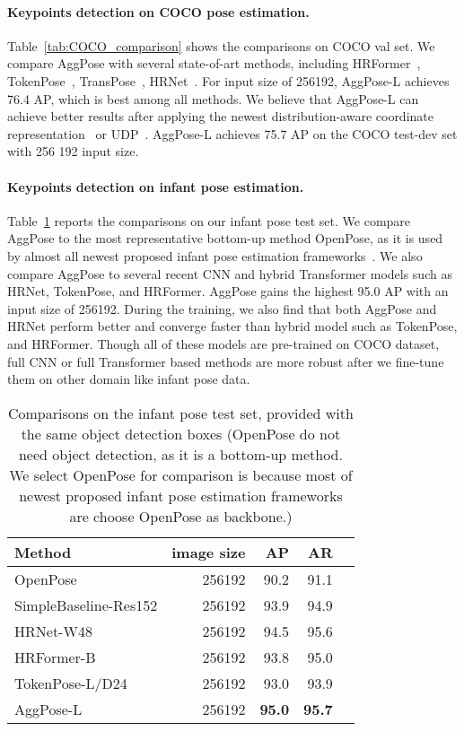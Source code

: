 \documentclass{article}
\begin{document}
\paragraph{Keypoints detection on COCO pose estimation.} Table~\ref{tab:COCO_comparison} shows the comparisons on COCO val set. We compare AggPose with several state-of-art methods, including HRFormer~\cite{yuan2021hrformer}, TokenPose~\cite{li2021tokenpose}, TransPose~\cite{yang2021transpose}, HRNet~\cite{wang2020deep}. For input size of 256192, AggPose-L achieves 76.4 AP, which is best among all methods. We believe that AggPose-L can achieve better results after applying the newest distribution-aware coordinate representation~\cite{zhang2020distribution} or UDP~\cite{huang2020devil}. AggPose-L achieves 75.7 AP on the COCO test-dev set with 256  192 input size. 

\paragraph{Keypoints detection on infant pose estimation.} Table~\ref{tab:infant_comparison} reports the comparisons on our infant pose test set. We compare AggPose to the most representative bottom-up method OpenPose, as it is used by almost all newest proposed infant pose estimation frameworks~\cite{silva2021future}. We also compare AggPose to several recent CNN and hybrid Transformer models such as HRNet, TokenPose, and HRFormer. AggPose gains the highest 95.0 AP with an input size of 256192. During the training, we also find that both AggPose and HRNet perform better and converge faster than hybrid model such as TokenPose, and HRFormer. Though all of these models are pre-trained on COCO dataset, full CNN or full Transformer based methods are more robust after we fine-tune them on other domain like infant pose data. 



\begin{table}
\centering
\begin{tabular}{lrrrr}
\toprule
Method  & image size  & AP  & AR\\
\midrule
OpenPose          & 256192  & 90.2  & 91.1      \\
SimpleBaseline-Res152  & 256192  & 93.9  & 94.9      \\
HRNet-W48         & 256192  & 94.5    & 95.6    \\
HRFormer-B        & 256192  & 93.8    & 95.0    \\
TokenPose-L/D24   & 256192  & 93.0     & 93.9    \\
AggPose-L         & 256192  & \textbf{95.0}     & \textbf{95.7}    \\
\bottomrule
\end{tabular}
\caption{Comparisons on the infant pose test set, provided with the same object detection boxes (OpenPose do not need object detection, as it is a bottom-up method. We select OpenPose for comparison is because most of newest proposed infant pose estimation frameworks are choose OpenPose as backbone.)}
\label{tab:infant_comparison}
\end{table}
\end{document}

